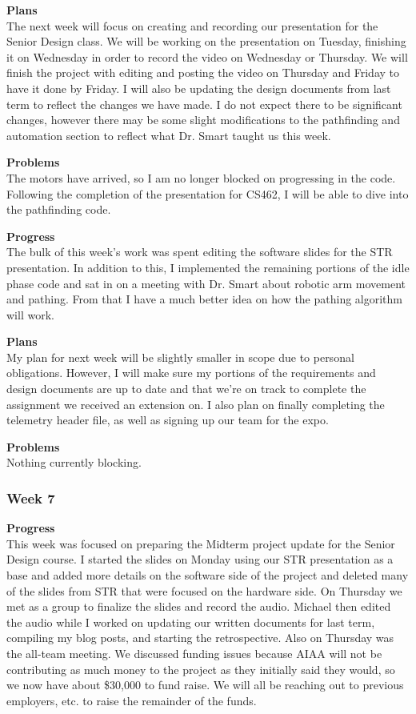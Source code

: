 \textbf{Plans} \\ 
The next week will focus on creating and recording our presentation for the Senior Design class. We will be working on the presentation on Tuesday, finishing it on Wednesday in order to record the video on Wednesday or Thursday. We will finish the project with editing and posting the video on Thursday and Friday to have it done by Friday. I will also be updating the design documents from last term to reflect the changes we have made. I do not expect there to be significant changes, however there may be some slight modifications to the pathfinding and automation section to reflect what Dr. Smart taught us this week.

\textbf{Problems} \\ 
The motors have arrived, so I am no longer blocked on progressing in the code. Following the completion of the presentation for CS462, I will be able to dive into the pathfinding code.

\textbf{Progress} \\
The bulk of this week's work was spent editing the software slides for the STR
presentation. In addition to this, I implemented the remaining portions of the
idle phase code and sat in on a meeting with Dr. Smart about robotic arm 
movement and pathing. From that I have a much better idea on how the pathing 
algorithm will work.

\textbf{Plans} \\
My plan for next week will be slightly smaller in scope due to personal 
obligations. However, I will make sure my portions of the requirements and 
design documents are up to date and that we're on track to complete the 
assignment we received an extension on. I also plan on finally completing the 
telemetry header file, as well as signing up our team for the expo.

\textbf{Problems} \\
Nothing currently blocking.

\subsubsection{Week 7}
\textbf{Progress} \\ 
This week was focused on preparing the Midterm project update for the Senior Design course. I started the slides on Monday using our STR presentation as a base and added more details on the software side of the project and deleted many of the slides from STR that were focused on the hardware side. On Thursday we met as a group to finalize the slides and record the audio. Michael then edited the audio while I worked on updating our written documents for last term, compiling my blog posts, and starting the retrospective. Also on Thursday was the all-team meeting. We discussed funding issues because AIAA will not be contributing as much money to the project as they initially said they would, so we now have about \$30,000 to fund raise. We will all be reaching out to previous employers, etc. to raise the remainder of the funds.

